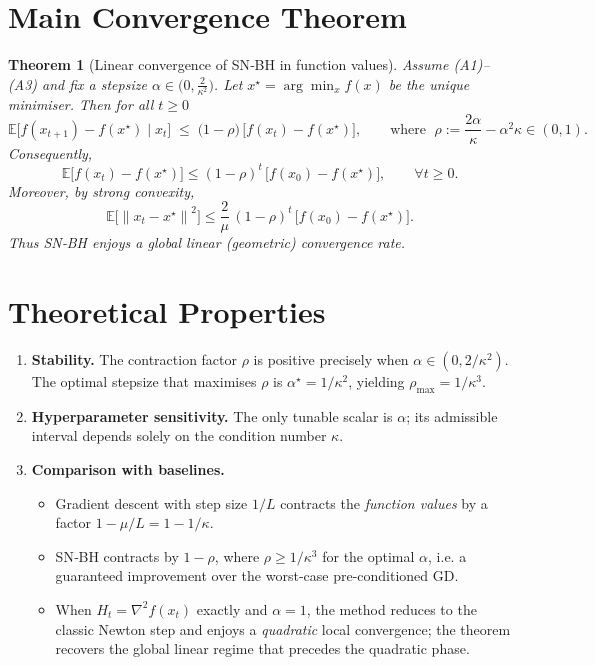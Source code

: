\documentclass{article}
\newtheorem{theorem}{Theorem}
\newcommand{\E}{\mathbb{E}}
\newcommand{\norm}[1]{\left\lVert #1\right\rVert}
\begin{document}
\section*{Main Convergence Theorem}
\begin{theorem}[Linear convergence of SN‑BH in function values]\label{thm:linear}
Assume (A1)–(A3) and fix a stepsize $\alpha\in\bigl(0,\frac{2}{\kappa^{2}}\bigr)$.  
Let $x^{\star}=\arg\min_{x}f(x)$ be the unique minimiser. Then for all $t\ge0$
\begin{equation}
   \E\!\bigl[f(x_{t+1})-f(x^{\star})\mid x_t\bigr]
   \;\le\;
   \bigl(1-\rho\bigr)\,\bigl[f(x_t)-f(x^{\star})\bigr],
   \qquad\text{where }\;
   \rho:=\frac{2\alpha}{\kappa}-\alpha^{2}\kappa \in(0,1). \tag{T1}
\end{equation}
Consequently,
\begin{equation}
   \E\!\bigl[f(x_{t})-f(x^{\star})\bigr]
   \le(1-\rho)^{t}\,\bigl[f(x_{0})-f(x^{\star})\bigr],
   \qquad\forall t\ge0. \tag{T2}
\end{equation}
Moreover, by strong convexity,
\begin{equation}
   \E\!\bigl[\norm{x_{t}-x^{\star}}^{2}\bigr]
   \le\frac{2}{\mu}\,(1-\rho)^{t}\,\bigl[f(x_{0})-f(x^{\star})\bigr].
   \tag{T3}
\end{equation}
Thus SN‑BH enjoys a global linear (geometric) convergence rate.
\end{theorem}

\section*{Theoretical Properties}
\begin{enumerate}[label=\arabic*.]
\item \textbf{Stability.} The contraction factor $\rho$ is positive precisely when
$\alpha\in(0,2/\kappa^{2})$.  The optimal stepsize that maximises $\rho$ is
$\alpha^{\star}=1/\kappa^{2}$, yielding $\rho_{\max}=1/\kappa^{3}$.
\item \textbf{Hyperparameter sensitivity.} The only tunable scalar is $\alpha$;
its admissible interval depends solely on the condition number $\kappa$.
\item \textbf{Comparison with baselines.}
\begin{itemize}
    \item Gradient descent with step size $1/L$ contracts the \emph{function
          values} by a factor $1-\mu/L=1-1/\kappa$.
    \item SN‑BH contracts by $1-\rho$, where $\rho\ge 1/\kappa^{3}$ for the
          optimal $\alpha$, i.e. a guaranteed improvement over the worst‑case
          pre‑conditioned GD.
    \item When $H_t=\nabla^{2}f(x_t)$ exactly and $\alpha=1$, the method reduces
          to the classic Newton step and enjoys a \emph{quadratic} local
          convergence; the theorem recovers the global linear regime that
          precedes the quadratic phase.
\end{itemize}
\end{enumerate}
\end{document}
